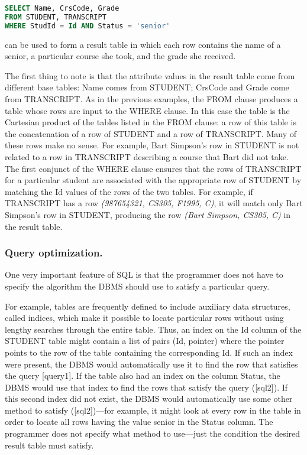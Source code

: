 \documentclass[]{article}
\begin{document}
\begin{lstlisting}[language=SQL]
SELECT Name, CrsCode, Grade
FROM STUDENT, TRANSCRIPT
WHERE StudId = Id AND Status = 'senior' 
\end{lstlisting}

can be used to form a result table in which each row contains the name
of a senior, a particular course she took, and the grade she received.

The first thing to note is that the attribute values in the result table
come from different base tables: Name comes from STUDENT; CrsCode and
Grade come from TRANSCRIPT. As in the previous examples, the FROM clause
produces a table whose rows are input to the WHERE clause. In this case
the table is the Cartesian product of the tables listed in the FROM
clause: a row of this table is the concatenation of a row of STUDENT and
a row of TRANSCRIPT. Many of these rows make no sense. For example, Bart
Simpson's row in STUDENT is not related to a row in TRANSCRIPT
describing a course that Bart did not take. The first conjunct of the
WHERE clause ensures that the rows of TRANSCRIPT for a particular
student are associated with the appropriate row of STUDENT by matching
the Id values of the rows of the two tables. For example, if TRANSCRIPT
has a row \emph{(987654321, CS305, F1995, C)}, it will match only Bart
Simpson's row in STUDENT, producing the row \emph{(Bart Simpson, CS305,
C)} in the result table.

\hypertarget{query-optimization.}{%
\subsubsection{Query optimization.}\label{query-optimization.}}

One very important feature of SQL is that the programmer does not have
to specify the algorithm the DBMS should use to satisfy a particular
query.

For example, tables are frequently defined to include auxiliary data
structures, called indices, which make it possible to locate particular
rows without using lengthy searches through the entire table. Thus, an
index on the Id column of the STUDENT table might contain a list of
pairs (Id, pointer) where the pointer points to the row of the table
containing the corresponding Id. If such an index were present, the DBMS
would automatically use it to find the row that satisfies the query
{[}query1{]}. If the table also had an index on the column Status, the
DBMS would use that index to find the rows that satisfy the query
({[}sql2{]}). If this second index did not exist, the DBMS would
automatically use some other method to satisfy ({[}sql2{]})---for
example, it might look at every row in the table in order to locate all
rows having the value senior in the Status column. The programmer does
not specify what method to use---just the condition the desired result
table must satisfy.
\end{document}
